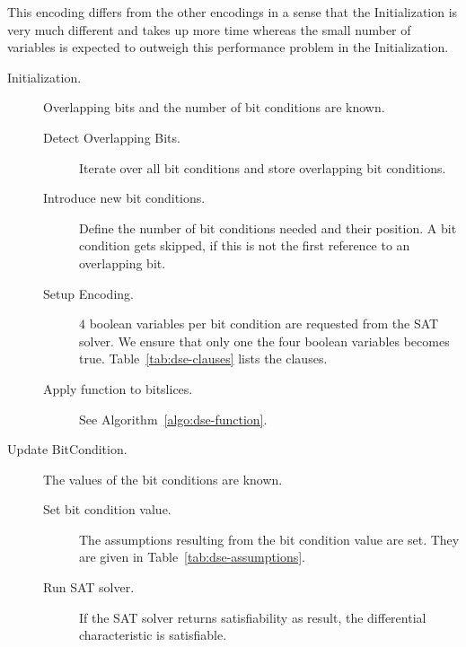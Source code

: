This encoding differs from the other encodings in a sense that the Initialization is very much different and takes up more time whereas the small number of variables is expected to outweigh this performance problem in the Initialization.
%
\begin{description}
  \item[Initialization.] Overlapping bits and the number of bit conditions are known.
    \begin{description}
      \item[Detect Overlapping Bits.] Iterate over all bit conditions and store overlapping bit conditions.
      \item[Introduce new bit conditions.] Define the number of bit conditions needed and their position. A bit condition gets skipped, if this is not the first reference to an overlapping bit.
      \item[Setup Encoding.] $4$ boolean variables per bit condition are requested from the SAT solver. We ensure that only one the four boolean variables becomes true. Table~\ref{tab:dse-clauses} lists the clauses.
      \item[Apply function to bitslices.] See Algorithm~\ref{algo:dse-function}.
    \end{description}
  \item[Update BitCondition.] The values of the bit conditions are known.
    \begin{description}
      \item[Set bit condition value.] The assumptions resulting from the bit condition value are set. They are given in Table~\ref{tab:dse-assumptions}.
      \item[Run SAT solver.] If the SAT solver returns satisfiability as result, the differential characteristic is satisfiable.
    \end{description}
\end{description}

